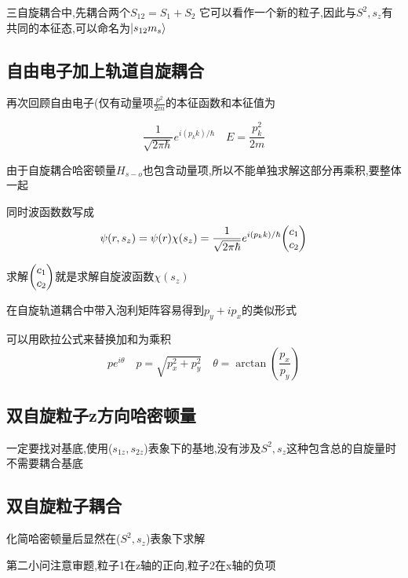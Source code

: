             \begin{formal}
                三自旋耦合中,先耦合两个$S_{12} = S_{1}+S_{2}$ 它可以看作一个新的粒子,因此与$S^{2},s_{z}$有共同的本征态,可以命名为$\ket{s_{12}m_{s}}$
            \end{formal}

        \subsection{自由电子加上轨道自旋耦合}
            再次回顾自由电子(仅有动量项$\frac{p^{2}}{2m}$的本征函数和本征值为

            $$
            \frac{1}{\sqrt{2\pi \hbar}}e^{i(p_{k}k)/\hbar} \quad E = \frac{p_{k}^{2}}{2m} 
            $$

            由于自旋耦合哈密顿量$H_{s-o}$也包含动量项,所以不能单独求解这部分再乘积,要整体一起

            同时波函数数写成
            $$
            \psi(r,s_{z}) = \psi(r) \chi(s_{z}) = \frac{1}{\sqrt{2\pi \hbar}}e^{i(p_{k}k)/\hbar} \mqty(c_{1} \\ c_{2})
            $$

            求解$\mqty(c_{1} \\ c_{2})$就是求解自旋波函数$\chi(s_{z})$

            \begin{formal}
                在自旋轨道耦合中带入泡利矩阵容易得到$ p_{y} + ip_{x} $的类似形式
                
                可以用欧拉公式来替换加和为乘积
                $$
                p e^{i \theta} \quad p = \sqrt{ p_{x}^{2} + p_{y}^{2} } \quad \theta = \arctan{(\frac{p_{x}}{p_{y}})}
                $$
            \end{formal}
            

        \subsection{双自旋粒子z方向哈密顿量}
            一定要找对基底,使用($s_{1z},s_{2z}$)表象下的基地,没有涉及$S^{2},s_{z}$这种包含总的自旋量时不需要耦合基底

        \subsection{双自旋粒子耦合}
            化简哈密顿量后显然在($S^{2},s_{z}$)表象下求解

            第二小问注意审题,粒子1在z轴的正向,粒子2在x轴的负项

